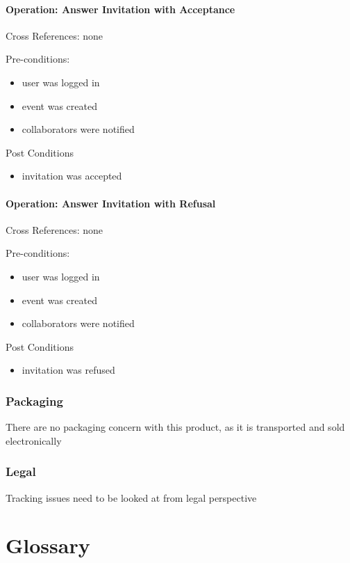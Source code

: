 \documentclass[10pt]{article}
\begin{document}
\subsection{Operation: Answer Invitation with Acceptance}

Cross References: none

Pre-conditions:
\begin{itemize}
\item user was logged in
\item event was created
\item collaborators were notified
\end{itemize}

Post Conditions
\begin{itemize}
\item invitation was accepted
\end{itemize}

\subsection{Operation: Answer Invitation with Refusal}

Cross References: none

Pre-conditions:
\begin{itemize}
\item user was logged in
\item event was created
\item collaborators were notified
\end{itemize}

Post Conditions
\begin{itemize}
\item invitation was refused
\end{itemize}

\section{Packaging}
There are no packaging concern with this product, as it is transported and sold electronically

\section{Legal}
Tracking issues need to be looked at from legal perspective


\part{Glossary}
\end{document}
